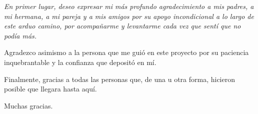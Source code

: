 \begin{flushright}
\Large\itshape
En primer lugar, deseo expresar mi más profundo agradecimiento a mis padres, a mi hermana, a mi pareja y a mis amigos por su apoyo incondicional a lo largo de este arduo camino, por acompañarme y levantarme cada vez que sentí que no podía más.

Agradezco asimismo a la persona que me guió en este proyecto por su paciencia inquebrantable y la confianza que depositó en mí.

Finalmente, gracias a todas las personas que, de una u otra forma, hicieron posible que llegara hasta aquí.

Muchas gracias.
\end{flushright}